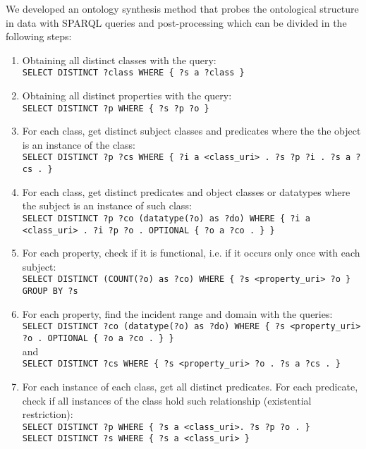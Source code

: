 \documentclass[review]{elsarticle}
\newcommand{\textttt}[1] {\texttt{\footnotesize#1}}
\begin{document}
We developed an ontology synthesis method that probes the ontological structure in data with
SPARQL queries and post-processing which can be divided in the following steps:
\begin{enumerate}[leftmargin=0cm]
    \item Obtaining all distinct classes with the query:\\
        \textttt{SELECT DISTINCT ?class WHERE \{ ?s a ?class \}}
    \item Obtaining all distinct properties with the query:\\
        \textttt{SELECT DISTINCT ?p WHERE \{ ?s ?p ?o \}}
    \item For each class, get distinct subject classes and predicates where the
        the object is an instance of the class:\\
        \textttt{SELECT DISTINCT ?p ?cs WHERE \{ ?i a <class\_uri> . ?s ?p ?i . ?s
        a ?cs . \}}
    \item For each class, get distinct predicates and object classes or
        datatypes where the subject is an instance of such class:\\
        \textttt{SELECT DISTINCT ?p ?co (datatype(?o) as ?do) WHERE \{ ?i
                a <class\_uri> . ?i ?p ?o . OPTIONAL \{ ?o a ?co . \} \}}
    \item For each property, check if it is functional, i.e. if it
        occurs only once with each subject:\\
        \textttt{SELECT DISTINCT (COUNT(?o) as ?co) WHERE \{ ?s
            <property\_uri> ?o \} GROUP BY ?s}
    \item For each property, find the incident range and domain with the
        queries:\\
        \textttt{SELECT DISTINCT ?co (datatype(?o) as ?do) WHERE \{ ?s
                <property\_uri> ?o . OPTIONAL \{ ?o a ?co . \} \}} \\
        and \\
        \textttt{SELECT DISTINCT ?cs WHERE \{ ?s <property\_uri> ?o . ?s a ?cs . \}}
    \item For each instance of each class, get all distinct predicates.
        For each predicate, check if all instances of the class
        hold such relationship (existential restriction):\\
        \textttt{SELECT DISTINCT ?p WHERE \{ ?s a <class\_uri>. ?s ?p ?o . \}}\\
        \textttt{SELECT DISTINCT ?s WHERE \{ ?s a <class\_uri> \}}\\

\end{enumerate}
\end{document}
